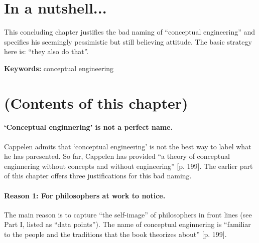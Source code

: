 \documentclass[
10pt, %
a4paper, %
twocolumn, %
landscape %
]{article}
\begin{document}
\pagestyle{myheadings} %
\markright{\doctitle} %


\thispagestyle{plain} %

\printtitle %


\section*{In a nutshell... }
This concluding chapter justifies the bad naming of ``conceptual engineering'' and specifies his seemingly pessimistic but still believing attitude.
The basic strategy here is: ``they also do that''.

\noindent \textbf{Keywords:} conceptual engineering

\section*{(Contents of this chapter)}
\paragraph{`Conceptual enginnering' is not a perfect name.}
Cappelen admits that `conceptual engineering' is not the best way to label what he has paresented.
So far, Cappelen has provided ``a theory of conceptual enginnering without concepts and without engineering''
[p. 199].
The earlier part of this chapter offers three justifications for this bad naming.

\paragraph{Reason 1: For philosophers at work to notice. }
The main reason is to capture ``the self-image'' of philosophers in front lines (see Part I, listed as ``data points'').
The name of conceptual enginnering is ``familiar to the people and the traditions that the book theorizes about'' [p. 199].
\end{document}
